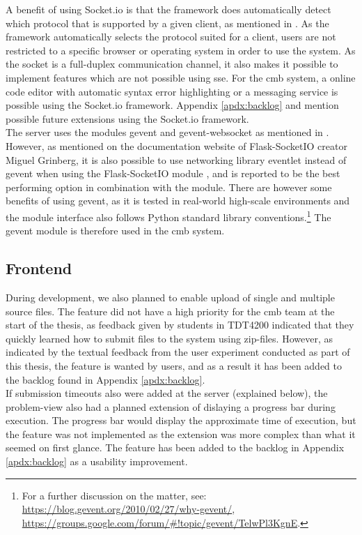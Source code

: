 A benefit of using Socket.io is that the framework does automatically detect which protocol that is supported by a given client, as mentioned in . As the framework automatically selects the protocol suited for a client, users are not restricted to a specific browser or operating system in order to use the system. As the socket is a full-duplex communication channel, it also makes it possible to implement features which are not possible using \gls{sse}. For the \gls{cmb} system, a online code editor with automatic syntax error highlighting or a messaging service is possible using the Socket.io framework. Appendix \ref{apdx:backlog} and  mention possible future extensions using the Socket.io framework. \\

The server uses the modules gevent \cite{GEVENT} and gevent-websocket \cite{GEVENTWEBSOCKET} as mentioned in . However, as mentioned on the documentation website of Flask-SocketIO creator Miguel Grinberg, it is also possible to use networking library eventlet \cite{EVENTLET} instead of gevent when using the Flask-SocketIO module \cite{FLASKSOCKETIO}, and is reported to be the best performing option in combination with the module. There are however some benefits of using gevent, as it is tested in real-world high-scale environments and the module interface also follows Python standard library conventions.\footnote{For a further discussion on the matter, see: \url{https://blog.gevent.org/2010/02/27/why-gevent/}, \url{https://groups.google.com/forum/\#!topic/gevent/TelwPl3KgnE}.} The gevent module is therefore used in the \gls{cmb} system.

\subsection{Frontend}
During development, we also planned to enable upload of single and multiple source files. The feature did not have a high priority for the \gls{cmb} team at the start of the thesis, as feedback given by students in TDT4200 indicated that they quickly learned how to submit files to the system using zip-files. However, as indicated by the textual feedback from the user experiment conducted as part of this thesis, the feature is wanted by users, and as a result it has been added to the backlog found in Appendix \ref{apdx:backlog}. \\

If submission timeouts also were added at the server (explained below), the problem-view also had a planned extension of dislaying a progress bar during execution. The progress bar would display the approximate time of execution, but the feature was not implemented as the extension was more complex than what it seemed on first glance. The feature has been added to the backlog in Appendix \ref{apdx:backlog} as a usability improvement.


